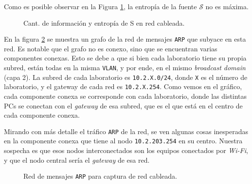 
Como es posible observar en la Figura \ref{res:esc1:fig1}, la entropía de la fuente $\mathcal{S}$ no es máxima.


\begin{figure}[h]
	\caption{Cant. de información y entropía de S en red cableada.}
    \label{res:esc1:fig1}
\end{figure}

En la figura \ref{res:esc1:fig2} se muestra un grafo de la red de mensajes \texttt{ARP} que subyace en esta red. Es notable que el grafo no es conexo, sino que se encuentran varias componentes conexas. Esto se debe a que si bien cada laboratorio tiene su propia subred, están todas en la misma \texttt{VLAN}, y por ende, en el mismo \emph{broadcast domain} (capa 2). La subred de cada laboratorio es \texttt{10.2.X.0/24}, donde \texttt{X} es el número de laboratorio, y el gateway de cada red es \texttt{10.2.X.254}. Como vemos en el gráfico, cada componente conexa se corresponde con cada laboratorio, donde las distintas PCs se conectan con el \emph{gateway} de esa subred, que es el que está en el centro de cada componente conexa.

Mirando con más detalle el tráfico \texttt{ARP} de la red, se ven algunas cosas inesperadas en la componente conexa que tiene al nodo \texttt{10.2.203.254} en su centro. Nuestra sospecha es que esos nodos interconectados son los equipos conectados por \emph{Wi-Fi}, y que el nodo central sería el \emph{gateway} de esa red.




\begin{figure}[H]
    \caption{Red de mensajes \texttt{ARP} para captura de red cableada.}
    \label{res:esc1:fig2}
\end{figure}

